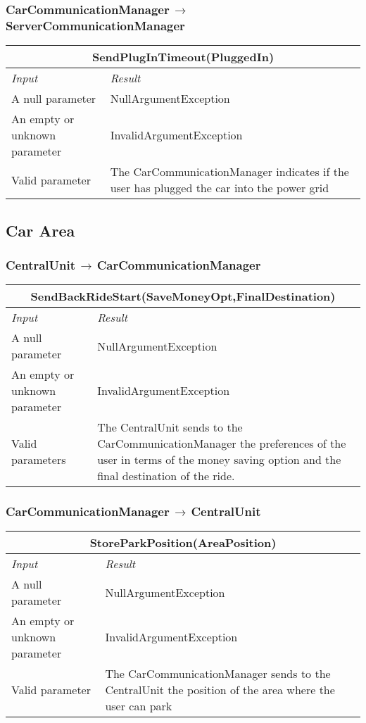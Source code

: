 \documentclass[11pt,a4paper]{report}
\begin{document}
\subsubsection{CarCommunicationManager$\,\to\,$ServerCommunicationManager}
\begin{tabularx}{\textwidth}{|X|X|}
	\hline
	\multicolumn{2}{|c|}{\textbf{SendPlugInTimeout(PluggedIn)}}\\
	\hline
	\textit{Input} & \textit{Result}\\
	\hline
	A null parameter & NullArgumentException\\
	\hline
	An empty or unknown parameter & InvalidArgumentException\\
	\hline
	Valid parameter & The CarCommunicationManager indicates if the user has plugged the car into the power grid\\
	\hline
\end{tabularx}
\subsection{Car Area}
\subsubsection{CentralUnit$\,\to\,$CarCommunicationManager}
\begin{tabularx}{\textwidth}{|X|X|}
	\hline
	\multicolumn{2}{|c|}{\textbf{SendBackRideStart(SaveMoneyOpt,FinalDestination)}}\\
	\hline
	\textit{Input} & \textit{Result}\\
	\hline
	A null parameter & NullArgumentException\\
	\hline
	An empty or unknown parameter & InvalidArgumentException\\
	\hline
	Valid parameters & The CentralUnit sends to the CarCommunicationManager the preferences of the user in terms of the money saving option and the final destination of the ride.\\
	\hline
\end{tabularx}
\subsubsection{CarCommunicationManager$\,\to\,$CentralUnit}
\begin{tabularx}{\textwidth}{|X|X|}
	\hline
	\multicolumn{2}{|c|}{\textbf{StoreParkPosition(AreaPosition)}}\\
	\hline
	\textit{Input} & \textit{Result}\\
	\hline
	A null parameter & NullArgumentException\\
	\hline
	An empty or unknown parameter & InvalidArgumentException\\
	\hline
	Valid parameter & The CarCommunicationManager sends to the CentralUnit the position of the area where the user can park\\
	\hline
\end{tabularx}
\end{document}
